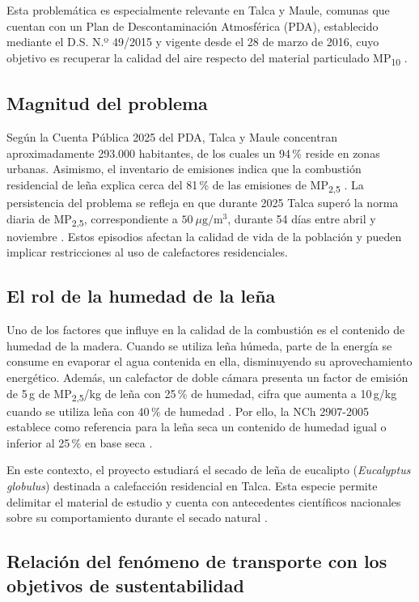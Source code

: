 \documentclass[11pt,a4paper]{article}
\begin{document}
Esta problemática es especialmente relevante en Talca y Maule, comunas que cuentan con un Plan de Descontaminación Atmosférica (PDA), establecido mediante el D.S. N.º 49/2015 y vigente desde el 28 de marzo de 2016, cuyo objetivo es recuperar la calidad del aire respecto del material particulado MP\textsubscript{10} \cite{mma_ds49}.

\subsection{Magnitud del problema}

Según la Cuenta Pública 2025 del PDA, Talca y Maule concentran aproximadamente 293.000 habitantes, de los cuales un 94\,\% reside en zonas urbanas. Asimismo, el inventario de emisiones indica que la combustión residencial de leña explica cerca del 81\,\% de las emisiones de MP\textsubscript{2,5} \cite{sma2021}. La persistencia del problema se refleja en que durante 2025 Talca superó la norma diaria de MP\textsubscript{2,5}, correspondiente a $50\ \mu\mathrm{g/m^3}$, durante 54 días entre abril y noviembre \cite{mma_cuenta2025}. Estos episodios afectan la calidad de vida de la población y pueden implicar restricciones al uso de calefactores residenciales.

\subsection{El rol de la humedad de la leña}

Uno de los factores que influye en la calidad de la combustión es el contenido de humedad de la madera. Cuando se utiliza leña húmeda, parte de la energía se consume en evaporar el agua contenida en ella, disminuyendo su aprovechamiento energético. Además, un calefactor de doble cámara presenta un factor de emisión de 5\,g de MP\textsubscript{2,5}/kg de leña con 25\,\% de humedad, cifra que aumenta a 10\,g/kg cuando se utiliza leña con 40\,\% de humedad \cite{mma2023}. Por ello, la NCh 2907-2005 establece como referencia para la leña seca un contenido de humedad igual o inferior al 25\,\% en base seca \cite{minenergia}.

En este contexto, el proyecto estudiará el secado de leña de eucalipto (\textit{Eucalyptus globulus}) destinada a calefacción residencial en Talca. Esta especie permite delimitar el material de estudio y cuenta con antecedentes científicos nacionales sobre su comportamiento durante el secado natural \cite{ananias1991}.

\subsection{Relación del fenómeno de transporte con los objetivos de sustentabilidad}
\end{document}
